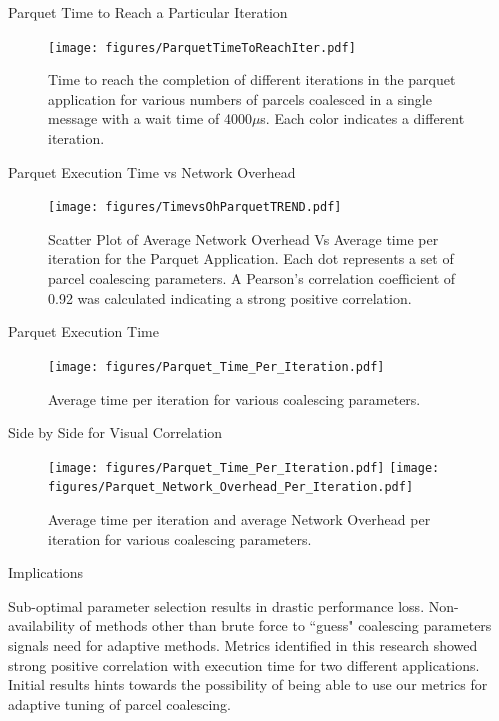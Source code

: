 \documentclass[10pt]{beamer}
\begin{document}
\begin{frame}{Parquet Time to Reach a Particular Iteration}
\begin{figure}
	\centering
	\texttt{[image: figures/ParquetTimeToReachIter.pdf]}
	\caption{{Time to reach the completion of different iterations in the parquet application for various numbers of parcels coalesced in a single message with a wait time of 4000$\mu$s. Each color indicates a different iteration.}}
	\label{figureTub}
\end{figure}
\end{frame}

\begin{frame}{Parquet Execution Time vs Network Overhead}
\begin{figure}
	\centering
	\texttt{[image: figures/TimevsOhParquetTREND.pdf]}
	\caption{{Scatter Plot of Average Network Overhead Vs Average time per iteration for the Parquet Application. Each dot represents a set of parcel coalescing parameters. A Pearson's correlation coefficient of 0.92 was calculated indicating a strong positive correlation.}}
	\label{figureETVSOHParq}
\end{figure}
\end{frame}

\begin{frame}{Parquet Execution Time}
\begin{figure}
	\centering
	\texttt{[image: figures/Parquet\_Time\_Per\_Iteration.pdf]}
	\caption{{Average time per iteration for various coalescing parameters.}}
	\label{figureTime-Parq}
\end{figure}
\end{frame}

\begin{frame}{Side by Side for Visual Correlation}
\begin{figure}
	\texttt{[image: figures/Parquet\_Time\_Per\_Iteration.pdf]}
	\texttt{[image: figures/Parquet\_Network\_Overhead\_Per\_Iteration.pdf]}
	\caption{{Average time per iteration and average Network Overhead per iteration for various coalescing parameters. }}
\end{figure}
\end{frame}

\begin{frame}{Implications}
\begin{outline}
	\1 Sub-optimal parameter selection results in drastic performance loss.
	\1 Non-availability of methods other than brute force  to ``guess" coalescing parameters signals need for adaptive methods.
	\1 Metrics identified in this research showed strong positive correlation with execution time for two different applications.
	\1 Initial results hints towards the possibility of being able to use our metrics for adaptive tuning of parcel coalescing.
\end{outline}
\end{frame}
\end{document}

